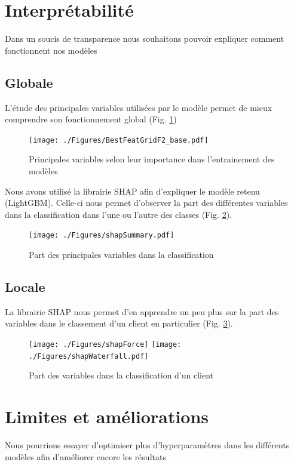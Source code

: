 \documentclass[12pt, a4paper]{article}
\begin{document}
\section{Interprétabilité}

Dans un soucis de transparence nous souhaitons pouvoir expliquer comment fonctionnent nos modèles

\subsection{Globale}

L'étude des principales variables utilisées par le modèle permet de mieux comprendre son fonctionnement global (Fig. \ref{fig:BestFeat})

\begin{figure}[h]
    \begin{center}
        \texttt{[image: ./Figures/BestFeatGridF2\_base.pdf]}
    \end{center}
    \caption{Principales variables selon leur importance dans l'entrainement des modèles}
    \label{fig:BestFeat}
\end{figure}

Nous avons utilisé la librairie SHAP afin d'expliquer le modèle retenu (LightGBM). Celle-ci nous permet d'observer la part des différentes variables dans la classification dans l'une ou l'autre des classes (Fig. \ref{fig:shapSummary}).

\begin{figure}[h]
    \begin{center}
        \texttt{[image: ./Figures/shapSummary.pdf]}
    \end{center}
    \caption{Part des principales variables dans la classification}
    \label{fig:shapSummary}
\end{figure}

\subsection{Locale}

La librairie SHAP nous permet d'en apprendre un peu plus sur la part des variables dans le classement d'un client en particulier (Fig. \ref{fig:shapWaterfall}).

\begin{figure}[h]
    \begin{center}
        \texttt{[image: ./Figures/shapForce]}
        \texttt{[image: ./Figures/shapWaterfall.pdf]}
    \end{center}
    \caption{Part des variables dans la classification d'un client}
    \label{fig:shapWaterfall}
\end{figure}

\section{Limites et améliorations}

Nous pourrions essayer d'optimiser plus d'hyperparamètres dans les différents modèles afin d'améliorer encore les résultats
\end{document}
